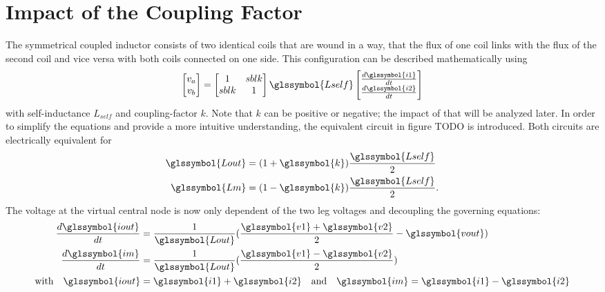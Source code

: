 \documentclass{IPEC2026}
\newcommand{\sbl}[1]{\glssymbol{#1}}
\newcommand{\acp}{\glspl}
\begin{document}

\section{Impact of the Coupling Factor}
The symmetrical coupled inductor consists of two identical coils that are wound in a way, that the flux of one coil links with the flux of the second coil and vice versa with both coils connected on one side. This configuration can be described mathematically using 
\begin{equation}
  \label{eq:StandardCoupling}
  \begin{bmatrix} v_a \\ v_b \end{bmatrix} = \begin{bmatrix} 1 & sbl{k} \\ sbl{k} & 1 \end{bmatrix} \sbl{Lself} \begin{bmatrix} \frac{d\sbl{i1}}{dt}  \\ \frac{d\sbl{i2}}{dt} \end{bmatrix}
\end{equation}
with self-inductance $L_{self}$ and coupling-factor $k$. Note that $k$ can be positive or negative; the impact of that will be analyzed later.
In order to simplify the equations and provide a more intuitive understanding, the equivalent circuit in figure TODO is introduced. Both circuits are electrically equivalent for
\begin{equation}
  \label{eq:LoutandLmfromk}
  \begin{aligned}
    \sbl{Lout} & = (1+\sbl{k})\frac{\sbl{Lself}}{2} \\
    \sbl{Lm} & = (1-\sbl{k})\frac{\sbl{Lself}}{2}.
  \end{aligned}
\end{equation}
The voltage at the virtual central node is now only dependent of the two leg voltages \sbl{v1} and \sbl{v2} decoupling the governing equations:
\begin{equation}
  \label{eq:TransformerModel}
  \begin{aligned}
    \frac{d\sbl{iout}}{dt} &= \frac{1}{\sbl{Lout}} (\frac{\sbl{v1} + \sbl{v2}}{2}-\sbl{vout}) \\
    \frac{d\sbl{im}}{dt} &= \frac{1}{\sbl{Lout}} (\frac{\sbl{v1} - \sbl{v2}}{2}) \\
    \text{with} \quad \sbl{iout} &= \sbl{i1} + \sbl{i2} \quad \text{and} \quad \sbl{im} = \sbl{i1} - \sbl{i2}
  \end{aligned}
\end{equation}
\end{document}
